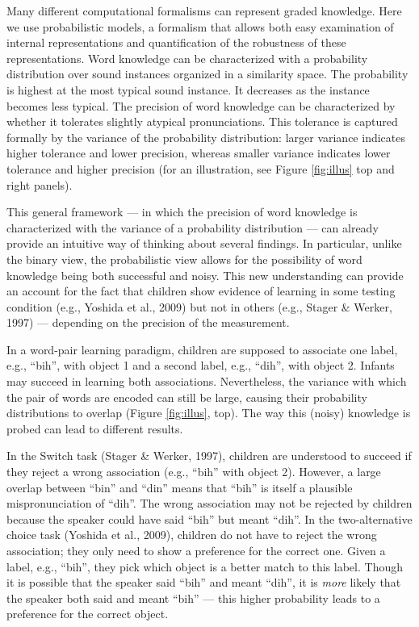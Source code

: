 \documentclass[english,,man,floatsintext]{apa6}
\theoremstyle{definition}
\theoremstyle{definition}
\theoremstyle{definition}
\theoremstyle{remark}
\begin{document}
Many different computational formalisms can represent graded knowledge.
Here we use probabilistic models, a formalism that allows both easy
examination of internal representations and quantification of the
robustness of these representations. Word knowledge can be characterized
with a probability distribution over sound instances organized in a
similarity space. The probability is highest at the most typical sound
instance. It decreases as the instance becomes less typical. The
precision of word knowledge can be characterized by whether it tolerates
slightly atypical pronunciations. This tolerance is captured formally by
the variance of the probability distribution: larger variance indicates
higher tolerance and lower precision, whereas smaller variance indicates
lower tolerance and higher precision (for an illustration, see Figure
\ref{fig:illus} top and right panels).

This general framework --- in which the precision of word knowledge is
characterized with the variance of a probability distribution --- can
already provide an intuitive way of thinking about several findings. In
particular, unlike the binary view, the probabilistic view allows for
the possibility of word knowledge being both successful and noisy. This
new understanding can provide an account for the fact that children show
evidence of learning in some testing condition (e.g., Yoshida et al.,
2009) but not in others (e.g., Stager \& Werker, 1997) --- depending on
the precision of the measurement.

In a word-pair learning paradigm, children are supposed to associate one
label, e.g., \enquote{bih}, with object 1 and a second label, e.g.,
\enquote{dih}, with object 2. Infants may succeed in learning both
associations. Nevertheless, the variance with which the pair of words
are encoded can still be large, causing their probability distributions
to overlap (Figure \ref{fig:illus}, top). The way this (noisy) knowledge
is probed can lead to different results.

In the Switch task (Stager \& Werker, 1997), children are understood to
succeed if they reject a wrong association (e.g., \enquote{bih} with
object 2). However, a large overlap between \enquote{bin} and
\enquote{din} means that \enquote{bih} is itself a plausible
mispronunciation of \enquote{dih}. The wrong association may not be
rejected by children because the speaker could have said \enquote{bih}
but meant \enquote{dih}. In the two-alternative choice task (Yoshida et
al., 2009), children do not have to reject the wrong association; they
only need to show a preference for the correct one. Given a label, e.g.,
\enquote{bih}, they pick which object is a better match to this label.
Though it is possible that the speaker said \enquote{bih} and meant
\enquote{dih}, it is \emph{more} likely that the speaker both said and
meant \enquote{bih} --- this higher probability leads to a preference
for the correct object.
\end{document}
